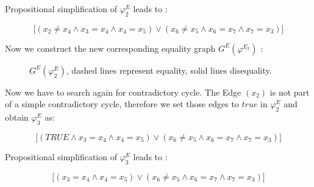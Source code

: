 \documentclass[11pt,a4paper]{uebung}
\begin{document}
 \begin{displaymath}
    [ (true \lor  x_2 = x_3 ) \land \big[ (x_2 \neq x_4 \land x_3=x_4
  \land x_4=x_5)
  \lor (x_6 \neq x_5 \land x_6=x_7 \land x_7=x_3)\big]
 \end{displaymath}

  Propositional simplification of $\varphi^E_2$ leads to :
 
 \begin{displaymath}
   \big[ (x_2 \neq x_4 \land x_3=x_4
  \land x_4=x_5)
  \lor (x_6 \neq x_5 \land x_6=x_7 \land x_7=x_3)\big]
 \end{displaymath}

Now we construct the new corresponding equality graph $G^{E} (\varphi^{E_2} )$ :

 \begin{figure}[h]
    \centering
    \caption{$G^E(\varphi^E_2)$, dashed lines represent equality, solid lines disequality.}
    \label{fig:sp2}
  \end{figure}

\bigskip

Now we have to search again for contradictory cycle.
The Edge $(x_2)$ is not part of a simple contradictory cycle, therefore we set those edges to $true$ in $\varphi^E_2$
and obtain $\varphi^E_3$ as:

\begin{displaymath}
   \big[ (TRUE \land x_3=x_4 \land x_4=x_5)
  \lor (x_6 \neq x_5 \land x_6=x_7 \land x_7=x_3)\big]
 \end{displaymath}
 

  Propositional simplification of $\varphi^E_3$ leads to :
 
 \begin{displaymath}
   \big[ ( x_3=x_4
  \land x_4=x_5)
  \lor (x_6 \neq x_5 \land x_6=x_7 \land x_7=x_3)\big]
 \end{displaymath}
\end{document}

